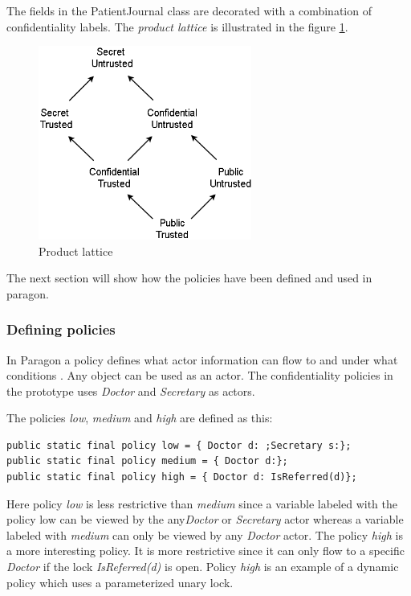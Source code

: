 The fields in the PatientJournal class are decorated with a combination of confidentiality labels. The \emph{product lattice} is illustrated in the figure \ref{fig:lattice_product}.

\begin{figure}[H] 
	\centering
	\includegraphics[width=7cm]{figures/lattice_product.png}
	\caption{Product lattice}
	\label{fig:lattice_product}
\end{figure}


The next section will show how the policies have been defined and used in paragon. 





\subsubsection{Defining policies}\label{policydef}
In Paragon a policy defines what actor information can flow to and under what conditions 
\cite{paragonprogramming}. Any object can be used as an actor. The confidentiality policies in the prototype uses \emph{Doctor} and \emph{Secretary} as actors. 

The policies \emph{low}, \emph{medium} and \emph{high} are defined as this:

\begin{lstlisting}
public static final policy low = { Doctor d: ;Secretary s:};
public static final policy medium = { Doctor d:};
public static final policy high = { Doctor d: IsReferred(d)};
\end{lstlisting}


Here policy \emph{low} is less restrictive than \emph{medium} since a variable labeled with the policy low can be viewed by the any\emph{Doctor} or \emph{Secretary} actor whereas a variable labeled with \emph{medium} can only be viewed by any \emph{Doctor} actor. The policy \emph{high} is a more interesting policy. It is more restrictive since it can only flow to a specific \emph{Doctor} if the lock \emph{IsReferred(d)} is open. Policy \emph{high} is an example of a dynamic policy which uses a parameterized unary lock.

